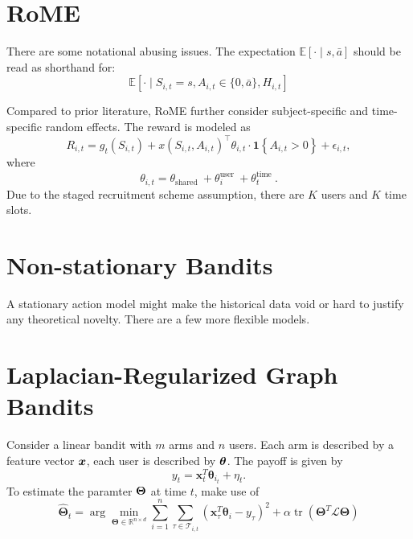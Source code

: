 \documentclass[letterpaper,11pt]{article}
\begin{document}
\section{RoME}

There are some notational abusing issues. The expectation $\mathbb{E}[\cdot \mid s, \bar{a}]$ should be read as shorthand for:
$$
\mathbb{E}\left[\cdot \mid S_{i, t}=s, A_{i, t} \in\{0, \bar{a}\}, H_{i, t}\right]
$$

Compared to prior literature, RoME further consider subject-specific and time-specific random effects.
The reward is modeled as 
$$
R_{i, t}=g_t\left(S_{i, t}\right)+x\left(S_{i, t}, A_{i, t}\right)^{\top} \theta_{i, t} \cdot \mathbf{1}\left\{A_{i, t}>0\right\}+\epsilon_{i, t},
$$
where 
$$
\theta_{i, t}=\theta_{\text {shared }}+\theta_i^{\text {user }}+\theta_t^{\text {time }}.
$$
Due to the staged recruitment scheme assumption, there are $K$ users and $K$ time slots. 



\section{Non-stationary Bandits}

A stationary action model might make the historical data void or hard to justify any theoretical novelty. 
There are a few more flexible models. 










\section{Laplacian-Regularized Graph Bandits}

Consider a linear bandit with $m$ arms and $n$ users. Each arm is described by a feature vector $\boldsymbol{x}$, each user is described by $\boldsymbol{\theta}$. The payoff is given by
$$
y_t=\mathbf{x}_t^T \boldsymbol{\theta}_{i_t}+\eta_t.
$$
To estimate the paramter $\boldsymbol{\Theta}$ at time $t$, make use of 
$$
\hat{\boldsymbol{\Theta}}_t=\arg \min _{\boldsymbol{\Theta} \in \mathbb{R}^{n \times d}} \sum_{i=1}^n \sum_{\tau \in \mathcal{T}_{i, t}}\left(\mathbf{x}_\tau^T \boldsymbol{\theta}_i-y_\tau\right)^2+\alpha \operatorname{tr}\left(\boldsymbol{\Theta}^T \mathcal{L} \boldsymbol{\Theta}\right)
$$
\end{document}
